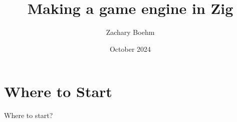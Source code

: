 \documentclass[11pt, letterpaper]{article}
\title{Making a game engine in Zig}
\author{Zachary Boehm}
\date{October 2024}
\begin{document}
\maketitle

\break

\tableofcontents

\break

\section{Where to Start}

Where to start?
\end{document}
